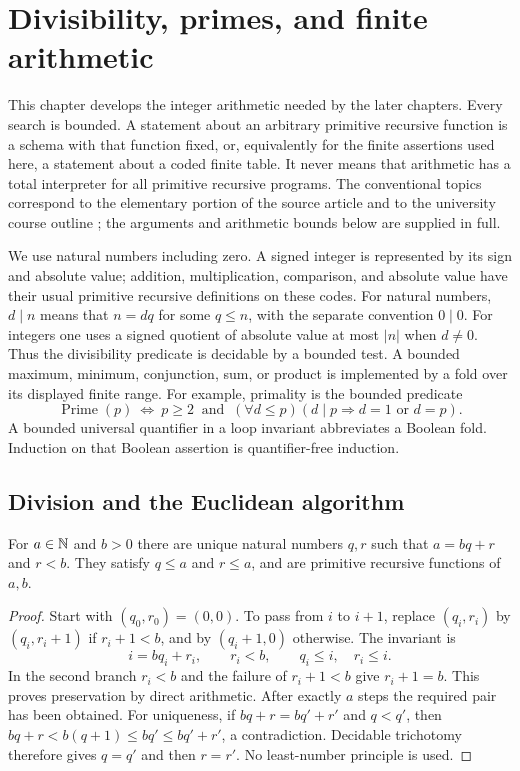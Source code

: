 \section{Divisibility, primes, and finite arithmetic}
\label{sec:elementary}

This chapter develops the integer arithmetic needed by the later chapters.
Every search is bounded.  A statement about an arbitrary primitive recursive
function is a schema with that function fixed, or, equivalently for the
finite assertions used here, a statement about a coded finite table.  It
never means that arithmetic has a total interpreter for all primitive
recursive programs.  The conventional topics correspond to the elementary
portion of the source article and to the university course outline
\cite{mit781}; the arguments and arithmetic bounds below are supplied in full.

We use natural numbers including zero.  A signed integer is represented by
its sign and absolute value; addition, multiplication, comparison, and
absolute value have their usual primitive recursive definitions on these
codes.  For natural numbers, $d\mid n$ means that $n=dq$ for some $q\le n$,
with the separate convention $0\mid0$.  For integers one uses a signed
quotient of absolute value at most $|n|$ when $d\ne0$.  Thus the divisibility
predicate is decidable by a bounded test.  A bounded maximum, minimum,
conjunction, sum, or product is implemented by a fold over its displayed
finite range.  For example, primality is the bounded predicate
\[
 \operatorname{Prime}(p)\ \Longleftrightarrow\
 p\ge2\ \text{ and }\ (\forall d\le p)
       (d\mid p\Longrightarrow d=1\text{ or }d=p).
\]
A bounded universal quantifier in a loop invariant abbreviates a Boolean
fold.  Induction on that Boolean assertion is quantifier-free induction.

\subsection{Division and the Euclidean algorithm}

\begin{theorem}\label{el:division}
For $a\in\mathbb N$ and $b>0$ there are unique natural numbers $q,r$ such that
$a=bq+r$ and $r<b$.  They satisfy $q\le a$ and $r\le a$, and are primitive
recursive functions of $a,b$.
\end{theorem}
\begin{proof}
Start with $(q_0,r_0)=(0,0)$.  To pass from $i$ to $i+1$, replace
$(q_i,r_i)$ by $(q_i,r_i+1)$ if $r_i+1<b$, and by $(q_i+1,0)$ otherwise.
The invariant is
\[
 i=bq_i+r_i,\qquad r_i<b,\qquad q_i\le i,\quad r_i\le i.
\]
In the second branch $r_i<b$ and the failure of $r_i+1<b$ give
$r_i+1=b$.  This proves preservation by direct arithmetic.  After exactly
$a$ steps the required pair has been obtained.  For uniqueness, if
$bq+r=bq'+r'$ and $q<q'$, then
$bq+r<b(q+1)\le bq'\le bq'+r'$, a contradiction.  Decidable trichotomy
therefore gives $q=q'$ and then $r=r'$.  No least-number principle is used.
\end{proof}

